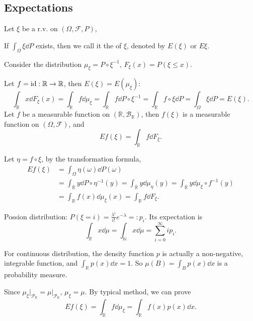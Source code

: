 \subsection{Expectations}
\label{sub:Expectations}
Let $\xi$ be a r.v. on $(\Omega, \mathscr{F}, P)$,
\begin{definition}[Expectations]
	If $\int_{\Omega} \xi \dd P$ exists, then we call it the 
	of $\xi$, denoted by $E(\xi)$ or $E\xi$.
\end{definition}

Consider the distribution $\mu_\xi = P\circ \xi^{-1}$,
$F_\xi(x) = P(\xi\le x)$.

Let $f = \operatorname{id} : \mathbb{R}\to \mathbb{R}$, then $E(\xi) = E(\mu_\xi)$:
\[
\int_{\mathbb{R}}x\dd F_\xi(x) = \int_{\mathbb{R}} f\dd \mu_\xi
= \int_{\mathbb{R}} f\dd P\circ \xi^{-1} = \int_{\mathbb{R}} f\circ \xi\dd P
= \int_\Omega \xi\dd P = E(\xi).
\]
Let $f$ be a measurable function on $(\mathbb{R}, \mathscr{B}_{\mathbb{R}})$,
then $f(\xi)$ is a measurable function on $(\Omega, \mathscr{F})$, and
\[
Ef(\xi) = \int_{\mathbb{R}} f\dd F_\xi.
\]

Let $\eta = f\circ \xi$, by the transformation formula,
\begin{align*}
    Ef(\xi)
	&= \int_\Omega \eta(\omega) \dd P(\omega)\\
	&= \int_{\overline{\mathbb{R}}} y \dd P\circ \eta^{-1}(y)
	= \int_{\overline{\mathbb{R}}} y \dd \mu_\eta(y)
	= \int_{\overline{\mathbb{R}}} y\dd \mu_\xi\circ f^{-1}(y)\\
	&= \int_{\mathbb{R}} f(x)\dd \mu_\xi(x) = \int_{\mathbb{R}}f\dd F_\xi.
\end{align*}

\begin{example}
    Possion distribution: $P(\xi = i) = \frac{\lambda^i}{i!}e^{-\lambda}=:p_i$.
	Its expectation is
	\[
	\int_{\mathbb{R}} x\dd \mu = \int_{\mathbb{N}} x\dd \mu
	= \sum_{i=0}^{\infty} ip_i.
	\]

	For continuous distribution, the density function $p$ is
	actually a non-negative, integrable function,
	and $\int_{\mathbb{R}} p(x)\dd x = 1$.
	So $\mu(B) = \int_B p(x)\dd x$ is a probability measure.

	Since $\mu_\xi\big|_{\mathscr{P}_{\mathbb{R}}} = \mu\big|_{\mathscr{P}_{\mathbb{R}}}$, $\mu_\xi = \mu$.
	By typical method, we can prove
	\[
		Ef(\xi) = \int_{\mathbb{R}} f\dd \mu_\xi = \int_{\mathbb{R}} f(x)p(x)\dd x.
	\]
\end{example}

